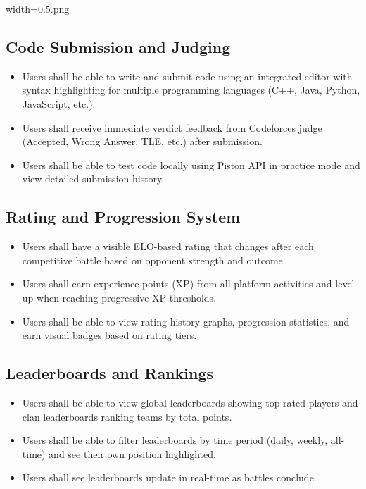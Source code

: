 width=0.5\linewidthimage.png\documentclass[12pt,a4paper]{article}
\begin{document}
\subsection{Code Submission and Judging}
\begin{itemize}
\item Users shall be able to write and submit code using an integrated editor with syntax highlighting for multiple programming languages (C++, Java, Python, JavaScript, etc.).
\item Users shall receive immediate verdict feedback from Codeforces judge (Accepted, Wrong Answer, TLE, etc.) after submission.
\item Users shall be able to test code locally using Piston API in practice mode and view detailed submission history.
\end{itemize}

\subsection{Rating and Progression System}
\begin{itemize}
\item Users shall have a visible ELO-based rating that changes after each competitive battle based on opponent strength and outcome.
\item Users shall earn experience points (XP) from all platform activities and level up when reaching progressive XP thresholds.
\item Users shall be able to view rating history graphs, progression statistics, and earn visual badges based on rating tiers.
\end{itemize}

\subsection{Leaderboards and Rankings}
\begin{itemize}
\item Users shall be able to view global leaderboards showing top-rated players and clan leaderboards ranking teams by total points.
\item Users shall be able to filter leaderboards by time period (daily, weekly, all-time) and see their own position highlighted.
\item Users shall see leaderboards update in real-time as battles conclude.
\end{itemize}
\end{document}
